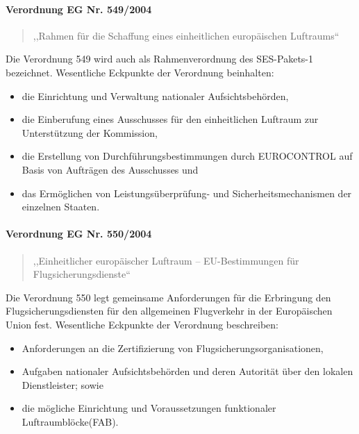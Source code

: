 
\paragraph{Verordnung EG Nr. 549/2004} \label{er_549}
    \begin{quote}
        \hspace{-2mm},,Rahmen für die Schaffung eines einheitlichen europäischen Luftraums``\cite{2004R0549, 2004R0549_summary}
    \end{quote}
Die Verordnung 549 wird auch als Rahmenverordnung des SES-Pakets-1 bezeichnet.
Wesentliche Eckpunkte der Verordnung beinhalten:
    \begin{itemize}
        \item die Einrichtung und Verwaltung nationaler Aufsichtsbehörden,
        \item die Einberufung eines Ausschusses für den einheitlichen Luftraum zur Unterstützung der Kommission,
        \item die Erstellung von Durchführungsbestimmungen durch EUROCONTROL auf Basis von Aufträgen des Ausschusses und
        \item    das Ermöglichen von Leistungsüberprüfung- und Sicherheitsmechanismen der einzelnen Staaten. \cite{2004R0549_summary}
    \end{itemize}

\pagebreak
        
\paragraph{Verordnung EG Nr. 550/2004} \label{er_550}
\begin{quote}
    ,,Einheitlicher europäischer Luftraum – EU-Bestimmungen für Flugsicherungsdienste``\cite{2004R0550, 2004R0550_summary}
\end{quote}
    Die Verordnung 550 legt gemeinsame Anforderungen für die Erbringung den Flugsicherungsdiensten für den allgemeinen Flugverkehr in der Europäischen Union fest. 
Wesentliche Eckpunkte der Verordnung beschreiben:
    \begin{itemize}
        \item Anforderungen an die Zertifizierung von Flugsicherungsorganisationen,
        \item Aufgaben nationaler Aufsichtsbehörden und deren Autorität über den lokalen Dienstleister; sowie
        \item die mögliche Einrichtung und Voraussetzungen funktionaler Luftraumblöcke(FAB). \cite{2004R0550_summary}
    \end{itemize}

